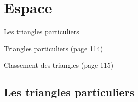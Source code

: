 \documentclass[a4paper,11pt]{report}
\begin{document}
\newcommand{\chapterName}{Espace}
\newcommand{\serieName}{Les triangles particuliers}


\chapter*{\chapterName}
\thispagestyle{empty}

\begin{amL}{\serieName}{
\item Triangles particuliers (page 114)
\item Classement des triangles (page 115)
}
\end{amL}
\section*{\serieName}
\setcounter{page}{1}
\thispagestyle{firstPage}



\end{document}
